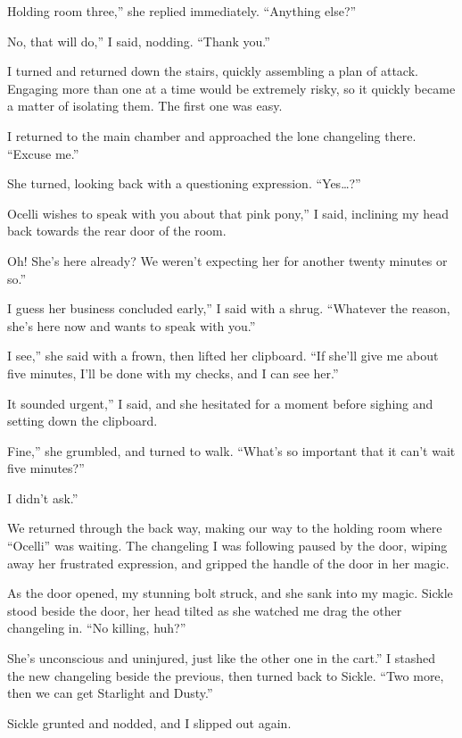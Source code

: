 \leavevmode{}Holding room three,” she replied immediately. “Anything else?”

\leavevmode{}No, that will do,” I said, nodding. “Thank you.”

I turned and returned down the stairs, quickly assembling a plan of attack. Engaging more than one at a time would be extremely risky, so it quickly became a matter of isolating them. The first one was easy.

I returned to the main chamber and approached the lone changeling there. “Excuse me.”

She turned, looking back with a questioning expression. “Yes…?”

\leavevmode{}Ocelli wishes to speak with you about that pink pony,” I said, inclining my head back towards the rear door of the room.

\leavevmode{}Oh! She’s here already? We weren’t expecting her for another twenty minutes or so.”

\leavevmode{}I guess her business concluded early,” I said with a shrug. “Whatever the reason, she’s here now and wants to speak with you.”

\leavevmode{}I see,” she said with a frown, then lifted her clipboard. “If she’ll give me about five minutes, I’ll be done with my checks, and I can see her.”

\leavevmode{}It sounded urgent,” I said, and she hesitated for a moment before sighing and setting down the clipboard.

\leavevmode{}Fine,” she grumbled, and turned to walk. “What’s so important that it can’t wait five minutes?”

\leavevmode{}I didn’t ask.”

We returned through the back way, making our way to the holding room where “Ocelli” was waiting. The changeling I was following paused by the door, wiping away her frustrated expression, and gripped the handle of the door in her magic.

As the door opened, my stunning bolt struck, and she sank into my magic. Sickle stood beside the door, her head tilted as she watched me drag the other changeling in. “No killing, huh?”

\leavevmode{}She’s unconscious and uninjured, just like the other one in the cart.” I stashed the new changeling beside the previous, then turned back to Sickle. “Two more, then we can get Starlight and Dusty.”

Sickle grunted and nodded, and I slipped out again.

